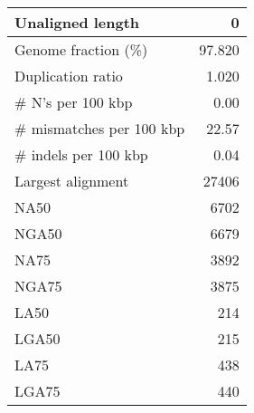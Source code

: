 \documentclass[12pt,a4paper]{article}
\begin{document}
\begin{table}[ht]
\begin{center}
\begin{tabular}{|l*{1}{|r}|}
Unaligned length & 0 \\ \hline
Genome fraction (\%) & 97.820 \\ \hline
Duplication ratio & 1.020 \\ \hline
\# N's per 100 kbp & 0.00 \\ \hline
\# mismatches per 100 kbp & 22.57 \\ \hline
\# indels per 100 kbp & 0.04 \\ \hline
Largest alignment & 27406 \\ \hline
NA50 & 6702 \\ \hline
NGA50 & 6679 \\ \hline
NA75 & 3892 \\ \hline
NGA75 & 3875 \\ \hline
LA50 & 214 \\ \hline
LGA50 & 215 \\ \hline
LA75 & 438 \\ \hline
LGA75 & 440 \\ \hline
\end{tabular}
\end{center}
\end{table}
\end{document}
